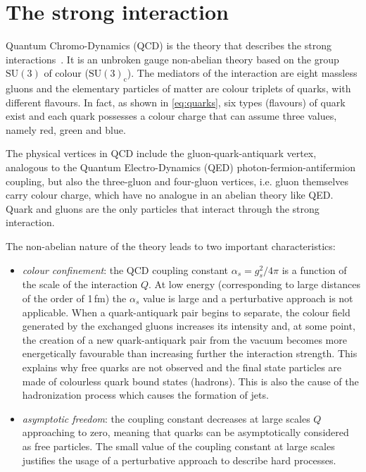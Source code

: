 \section{The strong interaction}
\label{sec:QCD}

Quantum Chromo-Dynamics (QCD) is the theory that describes the strong interactions~\cite{Ellis:1991qj}. It is an unbroken gauge non-abelian theory based on the group $\mathrm{SU(3)}$ of colour ($\mathrm{SU(3)_c}$). The mediators of the interaction are eight massless gluons and the elementary particles of matter are colour triplets of quarks, with different flavours. In fact, as shown in \eqref{eq:quarks}, six types (flavours) of quark exist and each quark possesses a colour charge that can assume three values, namely red, green and blue.

The physical vertices in QCD include the gluon-quark-antiquark vertex, analogous to the Quantum Electro-Dynamics (QED) photon-fermion-antifermion coupling, but also the three-gluon and four-gluon vertices, i.e. gluon themselves carry colour charge, which have no analogue in an abelian theory like QED. Quark and gluons are the only particles that interact through the strong interaction.

The non-abelian nature of the theory leads to two important characteristics:
\begin{itemize}
\item \emph{colour confinement}: the QCD coupling constant $\alpha_s = g_s^2/4\pi$ is a function of the scale of the interaction $Q$. At low energy (corresponding to large distances of the order of 1\,fm) the $\alpha_s$ value is large and a perturbative approach is not applicable. When a quark-antiquark pair begins to separate, the colour field generated by the exchanged gluons increases its intensity and, at some point, the creation of a new quark-antiquark pair from the vacuum becomes more energetically favourable than increasing further the interaction strength. This explains why free quarks are not observed and the final state particles are made of colourless quark bound states (hadrons). This is also the cause of the hadronization process which causes the formation of jets.

\item \emph{asymptotic freedom}: the coupling constant decreases at large scales $Q$ approaching to zero, meaning that quarks can be asymptotically considered as free particles. The small value of the coupling constant at large scales justifies the usage of a perturbative approach to describe hard processes.
\end{itemize}



